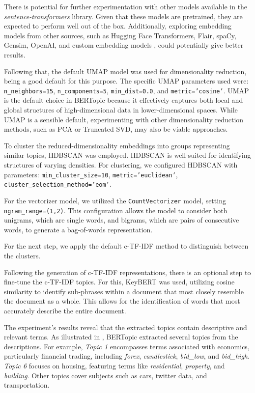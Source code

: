 \documentclass{article}
\begin{document}
There is potential for further experimentation with other models available in the \textit{sentence-transformers} library. Given that these models are pretrained, they are expected to perform well out of the box. Additionally, exploring embedding models from other sources, such as Hugging Face Transformers, Flair, spaCy, Gensim, OpenAI, and custom embedding models \cite{grootendorst_1_nodate}, could potentially give better results.

Following that, the default UMAP model was used for dimensionality reduction, being a good default for this purpose. The specific UMAP parameters used were: \texttt{n\_neighbors=15}, \texttt{n\_components=5}, \texttt{min\_dist=0.0}, and \texttt{metric='cosine'}. UMAP is the default choice in BERTopic because it effectively captures both local and global structures of high-dimensional data in lower-dimensional spaces. While UMAP is a sensible default, experimenting with other dimensionality reduction methods, such as PCA or Truncated SVD, may also be viable approaches.


To cluster the reduced-dimensionality embeddings into groups representing similar topics, HDBSCAN was employed. HDBSCAN is well-suited for identifying structures of varying densities. For clustering, we configured HDBSCAN with parameters: \texttt{min\_cluster\_size=10}, \texttt{metric='euclidean'}, \texttt{cluster\_selection\_method='eom'}.

For the vectorizer model, we utilized the \texttt{CountVectorizer} model, setting \texttt{ngram\_range=(1,2)}. This configuration allows the model to consider both unigrams, which are single words, and bigrams, which are pairs of consecutive words, to generate a bag-of-words representation.

For the next step, we apply the default c-TF-IDF method to distinguish between the clusters.

Following the generation of c-TF-IDF representations, there is an optional step to fine-tune the c-TF-IDF topics. For this, KeyBERT was used, utilizing cosine similarity to identify sub-phrases within a document that most closely resemble the document as a whole. This allows for the identification of words that most accurately describe the entire document.

The experiment's results reveal that the extracted topics contain descriptive and relevant terms. As illustrated in , BERTopic extracted several topics from the descriptions. For example, \textit{Topic 1} encompasses terms associated with economics, particularly financial trading, including \textit{forex}, \textit{candlestick}, \textit{bid\_low}, and \textit{bid\_high}. \textit{Topic 6} focuses on housing, featuring terms like \textit{residential}, \textit{property}, and \textit{building}. Other topics cover subjects such as cars, twitter data, and transportation.
\end{document}
